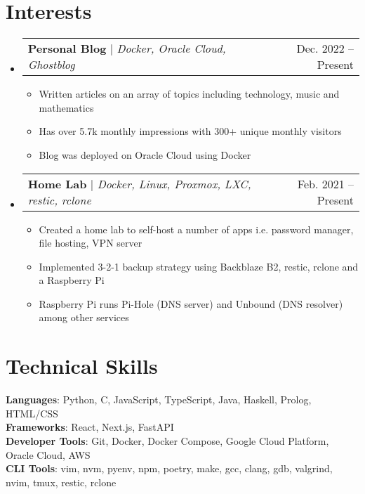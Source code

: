 \documentclass[letterpaper,11pt]{article}
\makeatletter
\newcommand{\resumeItem}[1]{
  \item\small{
    {#1 \vspace{-2pt}}
  }
}
\newcommand{\resumeProjectHeading}[2]{
    \item
    \begin{tabular*}{0.97\textwidth}{l@{\extracolsep{\fill}}r}
      \small#1 & #2 \\
    \end{tabular*}\vspace{-7pt}
}
\newcommand{\resumeSubHeadingListStart}{\begin{itemize}[leftmargin=0.15in, label={}]}
\newcommand{\resumeSubHeadingListEnd}{\end{itemize}}
\newcommand{\resumeItemListStart}{\begin{itemize}}
\newcommand{\resumeItemListEnd}{\end{itemize}\vspace{-5pt}}
\makeatother
\begin{document}
\section{Interests}
\resumeSubHeadingListStart
  \resumeProjectHeading
    {\textbf{Personal Blog} $|$ \emph{Docker, Oracle Cloud, Ghostblog}}{Dec. 2022 -- Present}
    \resumeItemListStart
      \resumeItem{Written articles on an array of topics including technology, music and mathematics}
      \resumeItem{Has over 5.7k monthly impressions with 300+ unique monthly visitors}
      \resumeItem{Blog was deployed on Oracle Cloud using Docker}
  \resumeItemListEnd
  \resumeProjectHeading
  {\textbf{Home Lab} $|$ \emph{Docker, Linux, Proxmox, LXC, restic, rclone}}{Feb. 2021 -- Present}
  \resumeItemListStart
    \resumeItem{Created a home lab to self-host a number of apps i.e. password manager, file hosting, VPN server}
    \resumeItem{Implemented 3-2-1 backup strategy using Backblaze B2, restic, rclone and a Raspberry Pi}
    \resumeItem{Raspberry Pi runs Pi-Hole (DNS server) and Unbound (DNS resolver) among other services}
  \resumeItemListEnd
\resumeSubHeadingListEnd

%
\section{Technical Skills}
 \begin{itemize}[leftmargin=0.15in, label={}]
    \small{\item{
     \textbf{Languages}{: Python, C, JavaScript, TypeScript, Java, Haskell, Prolog, HTML/CSS} \\
     \textbf{Frameworks}{: React, Next.js, FastAPI} \\
     \textbf{Developer Tools}{: Git, Docker, Docker Compose, Google Cloud Platform, Oracle Cloud, AWS} \\
     \textbf{CLI Tools}{: vim, nvm, pyenv, npm, poetry, make, gcc, clang, gdb, valgrind, nvim, tmux, restic, rclone}
    }}
 \end{itemize}


\end{document}

